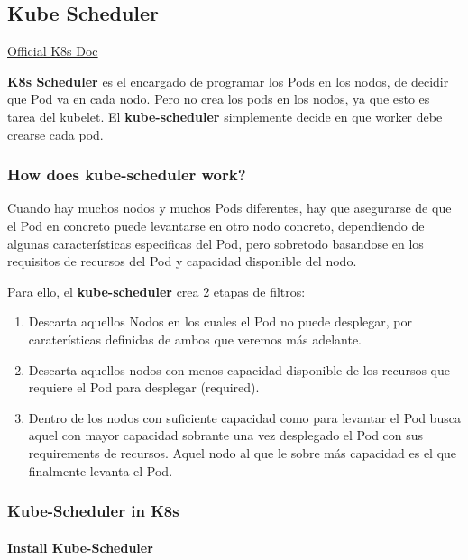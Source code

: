 \documentclass{article}
\begin{document}
\subsection{Kube Scheduler}

\href{https://kubernetes.io/docs/reference/command-line-tools-reference/kube-scheduler/}{Official K8s Doc}

\textbf{K8s Scheduler} es el encargado de programar los Pods en los nodos, de decidir que Pod va en cada nodo. Pero no crea los pods en los nodos, ya que esto es tarea del kubelet. El \textbf{kube-scheduler} simplemente decide en que worker debe crearse cada pod.

\subsubsection{How does kube-scheduler work?}

Cuando hay muchos nodos y muchos Pods diferentes, hay que asegurarse de que el Pod en concreto puede levantarse en otro nodo concreto, dependiendo de algunas características especificas del Pod, pero sobretodo basandose en los requisitos de recursos del Pod y capacidad disponible del nodo.

Para ello, el \textbf{kube-scheduler} crea 2 etapas de filtros:

\label{Scheduling}
\begin{enumerate}
    \item Descarta aquellos Nodos en los cuales el Pod no puede desplegar, por caraterísticas definidas de ambos que veremos más adelante.
    \item Descarta aquellos nodos con menos capacidad disponible de los recursos que requiere el Pod para desplegar (required).
    \item Dentro de los nodos con suficiente capacidad como para levantar el Pod busca aquel con mayor capacidad sobrante una vez desplegado el Pod con sus requirements de recursos. Aquel nodo al que le sobre más capacidad es el que finalmente levanta el Pod.
\end{enumerate}

\subsubsection{Kube-Scheduler in K8s}
\label{schduler}

\paragraph{Install Kube-Scheduler}
\end{document}
